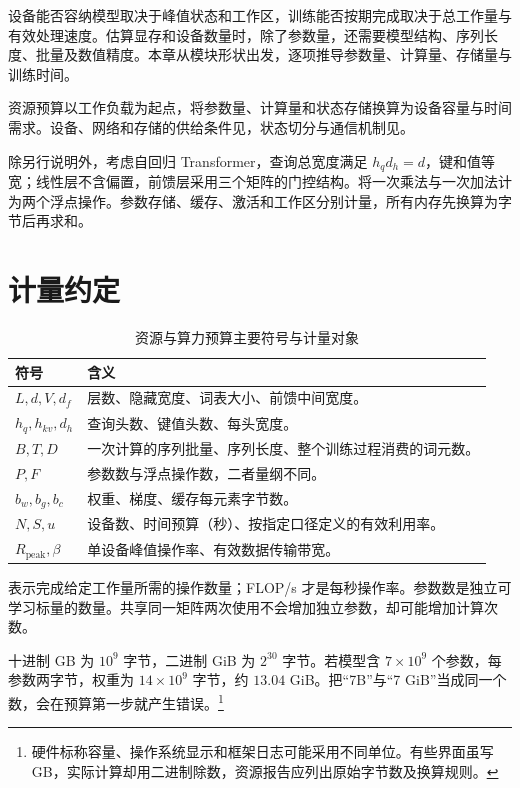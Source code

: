 \documentclass[../textbook.tex]{subfiles}
\begin{document}
\fi
{}

设备能否容纳模型取决于峰值状态和工作区，训练能否按期完成取决于总工作量与有效处理速度。估算显存和设备数量时，除了参数量，还需要模型结构、序列长度、批量及数值精度。本章从模块形状出发，逐项推导参数量、计算量、存储量与训练时间。

资源预算以工作负载为起点，将参数量、计算量和状态存储换算为设备容量与时间需求。设备、网络和存储的供给条件见，状态切分与通信机制见。

\begin{assumption}
除另行说明外，考虑自回归 Transformer，查询总宽度满足 $h_qd_h=d$，键和值等宽；线性层不含偏置，前馈层采用三个矩阵的门控结构。将一次乘法与一次加法计为两个浮点操作。参数存储、缓存、激活和工作区分别计量，所有内存先换算为字节后再求和。
\end{assumption}

\section{计量约定}

\begin{table}[htbp]
\centering
\caption{资源与算力预算主要符号与计量对象}
\label{tab:budget-symbols}
\begin{tabular}{ll}
\toprule 符号 & 含义\\\midrule
$L,d,V,d_f$ & 层数、隐藏宽度、词表大小、前馈中间宽度。\\
$h_q,h_{kv},d_h$ & 查询头数、键值头数、每头宽度。\\
$B,T,D$ & 一次计算的序列批量、序列长度、整个训练过程消费的词元数。\\
$P,F$ & 参数数与浮点操作数，二者量纲不同。\\
$b_w,b_g,b_c$ & 权重、梯度、缓存每元素字节数。\\
$N,S,u$ & 设备数、时间预算（秒）、按指定口径定义的有效利用率。\\
$R_{\mathrm{peak}},\beta$ & 单设备峰值操作率、有效数据传输带宽。\\
\bottomrule
\end{tabular}
\end{table}

表示完成给定工作量所需的操作数量；FLOP/s 才是每秒操作率。参数数是独立可学习标量的数量。共享同一矩阵两次使用不会增加独立参数，却可能增加计算次数。

十进制 GB 为 $10^9$ 字节，二进制 GiB 为 $2^{30}$ 字节。若模型含 $7\times10^9$ 个参数，每参数两字节，权重为 $14\times10^9$ 字节，约 $13.04$ GiB。把“7B”与“7 GiB”当成同一个数，会在预算第一步就产生错误。\footnote{硬件标称容量、操作系统显示和框架日志可能采用不同单位。有些界面虽写 GB，实际计算却用二进制除数，资源报告应列出原始字节数及换算规则。}
\end{document}
